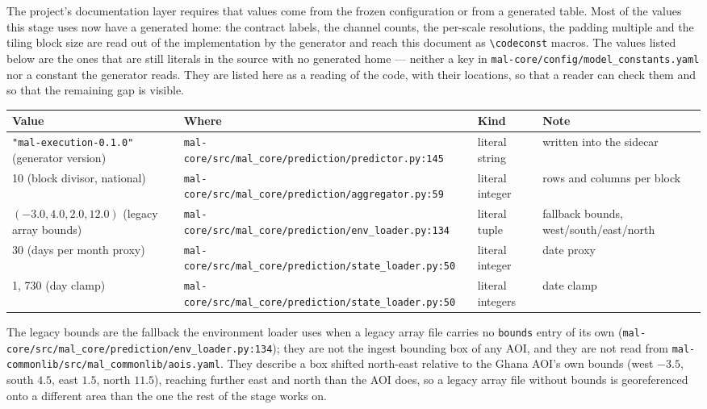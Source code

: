 \documentclass[11pt,a4paper]{article}
\newcommand{\code}[1]{\texttt{#1}}
\begin{document}
The project's documentation layer requires that values come from the frozen
configuration or from a generated table. Most of the values this stage uses
now have a generated home: the contract labels, the channel counts, the
per-scale resolutions, the padding multiple and the tiling block size are
read out of the implementation by the generator and reach this document as
\code{\textbackslash codeconst} macros. The values listed below are the ones that are still
literals in the source with no generated home --- neither a key in
\code{mal-core/config/model\_constants.yaml} nor a constant the generator
reads. They are listed here as a reading of the code, with their locations,
so that a reader can check them and so that the remaining gap is visible.

\begin{center}
\begin{longtable}{@{}llll@{}}
\toprule
Value & Where & Kind & Note \\
\midrule
\endhead
\code{"mal-execution-0.1.0"} (generator version) &
  \code{mal-core/src/mal\_core/prediction/predictor.py:145} &
  literal string & written into the sidecar \\
10 (block divisor, national) &
  \code{mal-core/src/mal\_core/prediction/aggregator.py:59} &
  literal integer & rows and columns per block \\
$(-3.0, 4.0, 2.0, 12.0)$ (legacy array bounds) &
  \code{mal-core/src/mal\_core/prediction/env\_loader.py:134} &
  literal tuple & fallback bounds, west/south/east/north \\
30 (days per month proxy) &
  \code{mal-core/src/mal\_core/prediction/state\_loader.py:50} &
  literal integer & date proxy \\
1, 730 (day clamp) &
  \code{mal-core/src/mal\_core/prediction/state\_loader.py:50} &
  literal integers & date clamp \\
\bottomrule
\end{longtable}
\end{center}

The legacy bounds are the fallback the environment loader uses when a legacy
array file carries no \code{bounds} entry of its own
(\code{mal-core/src/mal\_core/prediction/env\_loader.py:134}); they are not
the ingest bounding box of any AOI, and they are not read from
\code{mal-commonlib/src/mal\_commonlib/aois.yaml}. They describe a box
shifted north-east relative to the Ghana AOI's own bounds (west $-3.5$,
south $4.5$, east $1.5$, north $11.5$), reaching further east and north than
the AOI does, so a legacy array file without bounds is georeferenced onto a
different area than the one the rest of the stage works on.
\end{document}
